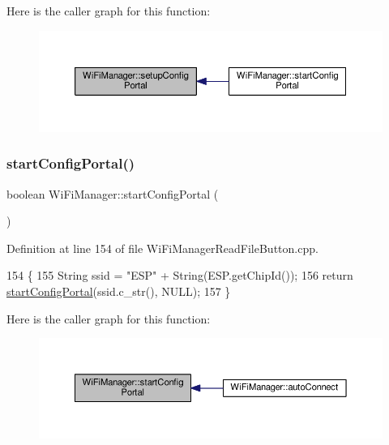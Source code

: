 Here is the caller graph for this function\+:
\nopagebreak
\begin{figure}[H]
\begin{center}
\leavevmode
\includegraphics[width=350pt]{d4/dc8/class_wi_fi_manager_a1743325d0dd86d011df96b22d2a0ddd6_icgraph}
\end{center}
\end{figure}
\mbox{\label{class_wi_fi_manager_ad781751307f7f623956126096a09a545}} 
\subsubsection{\texorpdfstring{start\+Config\+Portal()}{startConfigPortal()}\hspace{0.1cm}{\footnotesize\ttfamily [1/2]}}
{\footnotesize\ttfamily boolean Wi\+Fi\+Manager\+::start\+Config\+Portal (\begin{DoxyParamCaption}{ }\end{DoxyParamCaption})}



Definition at line 154 of file Wi\+Fi\+Manager\+Read\+File\+Button.\+cpp.


\begin{DoxyCode}
154                                        \{
155   String ssid = \textcolor{stringliteral}{"ESP"} + String(ESP.getChipId());
156   \textcolor{keywordflow}{return} \hyperlink{class_wi_fi_manager_ad781751307f7f623956126096a09a545}{startConfigPortal}(ssid.c\_str(), NULL);
157 \}
\end{DoxyCode}
Here is the caller graph for this function\+:
\nopagebreak
\begin{figure}[H]
\begin{center}
\leavevmode
\includegraphics[width=350pt]{d4/dc8/class_wi_fi_manager_ad781751307f7f623956126096a09a545_icgraph}
\end{center}
\end{figure}
\mbox{\label{class_wi_fi_manager_afaca5021edffb4d9a5bd39f7b0f7a686}} 
